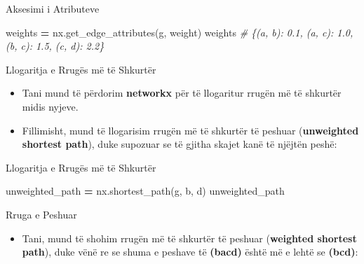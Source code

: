 \documentclass[
  ignorenonframetext,
]{beamer}
\newenvironment{Shaded}{\begin{snugshade}}{\end{snugshade}}
\newcommand{\CommentTok}[1]{\textcolor[rgb]{0.56,0.35,0.01}{\textit{#1}}}
\newcommand{\NormalTok}[1]{#1}
\newcommand{\OperatorTok}[1]{\textcolor[rgb]{0.81,0.36,0.00}{\textbf{#1}}}
\newcommand{\StringTok}[1]{\textcolor[rgb]{0.31,0.60,0.02}{#1}}
\providecommand{\tightlist}{%
  \setlength{\itemsep}{0pt}\setlength{\parskip}{0pt}}
\begin{document}
\begin{frame}[fragile]{Aksesimi i Atributeve}
\protect\hypertarget{aksesimi-i-atributeve}{}

\begin{Shaded}
\begin{Highlighting}[]
\NormalTok{weights }\OperatorTok{=}\NormalTok{ nx.get\_edge\_attributes(g, }\StringTok{\textquotesingle{}weight\textquotesingle{}}\NormalTok{)}
\NormalTok{weights}
\CommentTok{\# \{(\textquotesingle{}a\textquotesingle{}, \textquotesingle{}b\textquotesingle{}): 0.1, (\textquotesingle{}a\textquotesingle{}, \textquotesingle{}c\textquotesingle{}): 1.0, (\textquotesingle{}b\textquotesingle{}, \textquotesingle{}c\textquotesingle{}): 1.5, (\textquotesingle{}c\textquotesingle{}, \textquotesingle{}d\textquotesingle{}): 2.2\}}
\end{Highlighting}
\end{Shaded}
\end{frame}

\begin{frame}{Llogaritja e Rrugës më të Shkurtër}
\protect\hypertarget{llogaritja-e-rruguxebs-muxeb-tuxeb-shkurtuxebr}{}
\begin{itemize}
\item
  Tani mund të përdorim \textbf{networkx} për të llogaritur rrugën më të
  shkurtër midis nyjeve.
\item
  Fillimisht, mund të llogarisim rrugën më të shkurtër të peshuar
  (\textbf{unweighted shortest path}), duke supozuar se të gjitha skajet
  kanë të njëjtën peshë:
\end{itemize}
\end{frame}

\begin{frame}[fragile]{Llogaritja e Rrugës më të Shkurtër}
\protect\hypertarget{llogaritja-e-rruguxebs-muxeb-tuxeb-shkurtuxebr-1}{}

\begin{Shaded}
\begin{Highlighting}[]
\NormalTok{unweighted\_path }\OperatorTok{=}\NormalTok{ nx.shortest\_path(g, }\StringTok{\textquotesingle{}b\textquotesingle{}}\NormalTok{, }\StringTok{\textquotesingle{}d\textquotesingle{}}\NormalTok{)}
\NormalTok{unweighted\_path}
\end{Highlighting}
\end{Shaded}
\end{frame}

\begin{frame}{Rruga e Peshuar}
\protect\hypertarget{rruga-e-peshuar}{}
\begin{itemize}
\tightlist
\item
  Tani, mund të shohim rrugën më të shkurtër të peshuar
  (\textbf{weighted shortest path}), duke vënë re se shuma e peshave të
  \textbf{(bacd)} është më e lehtë se \textbf{(bcd)}:
\end{itemize}
\end{frame}
\end{document}
